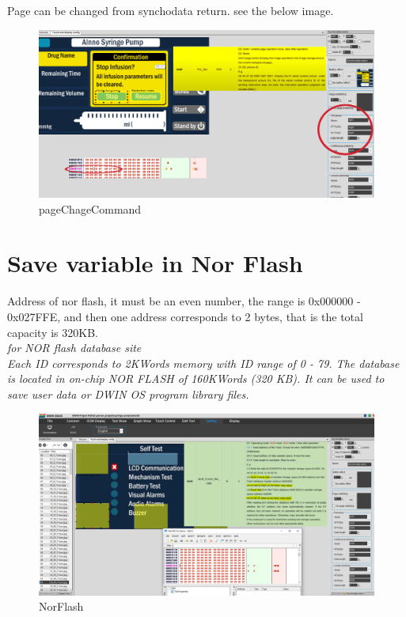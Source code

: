 \documentclass[12pt, A4]{article} %
\begin{document}
Page can be changed from synchodata return. see the below image.

\begin{figure}[!htb] %
	\centering
	\includegraphics[width=14cm]{pageChageCommand} 
	\caption{pageChageCommand}
\end{figure}

\newpage

\section{Save variable in Nor Flash}

Address of nor flash, it must be an even number, the range is 0x000000 - 0x027FFE, and then one address corresponds to 2 bytes, that is the total capacity is 320KB.\\

\emph{for NOR flash database site \\
Each ID corresponds to 2KWords memory with ID range of 0 - 79.
The database is located in on-chip NOR FLASH of 160KWords (320 KB). It
can be used to save user data or DWIN OS program library files.}


\begin{figure}[!htb] %
	\centering
	\includegraphics[width=14cm]{NorFlash} 
	\caption{NorFlash}
\end{figure}

\newpage
\end{document}
